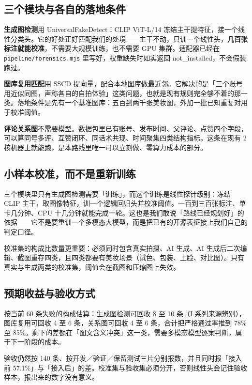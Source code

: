 \documentclass[11pt]{ctexart}
\begin{document}
\subsection{三个模块与各自的落地条件}

\textbf{生成图检测}用 UniversalFakeDetect：CLIP ViT-L/14 冻结主干提特征，接一个线性分类头。它的好处正好匹配我们的处境——主干不动，只训一个线性头，\textbf{几百张标注就能校准}，不需要大规模训练，也不需要 GPU 集群。适配器已经在 \texttt{pipeline/forensics.mjs} 里写好，权重缺失时如实返回 not\_installed，不会假装跑过。

\textbf{图库复用匹配}用 SSCD 提向量，配合本地图库做最近邻。它解决的是「三个账号用近似同图，声称各自的自拍体验」这类问题，也就是现有规则完全够不着的那一类。落地条件是先有一个基准图库：五百到两千张美妆图，外加一批已知重复对用于校准阈值。

\textbf{评论关系图}不需要模型。数据包里已有账号、发布时间、父评论、点赞四个字段，可以算同号多评、互赞闭环、同话术共现、时间聚集四类结构指标。这条在现有 2 核机器上就能跑，是本路线里唯一可以立刻做、零算力成本的部分。

\subsection{小样本校准，而不是重新训练}

三个模块里只有生成图检测需要「训练」，而这个训练是线性探针级别：冻结 CLIP 主干，取图像特征，训一个逻辑回归头并校准阈值。一百到三百张标注、单卡几分钟、CPU 十几分钟就能完成一轮。这也是我们敢说「路线已经规划好」的依据——它不是要重训一个多模态大模型，而是把已有的开源表征接上我们自己的判定口径。

校准集的构成比数量更重要：必须同时包含真实拍摄、AI 生成、AI 生成后二次编辑、截图重存四类，且四类都要有美妆场景（试色、包装、上脸、对比图）。只有真实与生成两类的校准集，阈值会在截图和压缩图上失效。

\subsection{预期收益与验收方式}

按当前 60 条失败的构成估算：生成图检测可回收 8 至 10 条（I 系列来源辨别），图库复用可回收 4 至 6 条，关系图可回收 4 至 6 条，合计把严格通过率推到 78\% 至 85\%。剩下的差额在「图文含义冲突」这一类，需要多模态模型逐案判断，属于下一阶段的成本。

验收仍然按 140 条、按开发／验证／保留测试三片分别报数，并且同时报「接入前 57.1\%」与「接入后」的差。校准集与验收集必须分开，否则线性头会记住验收样本，报出来的数字没有意义。
\end{document}
